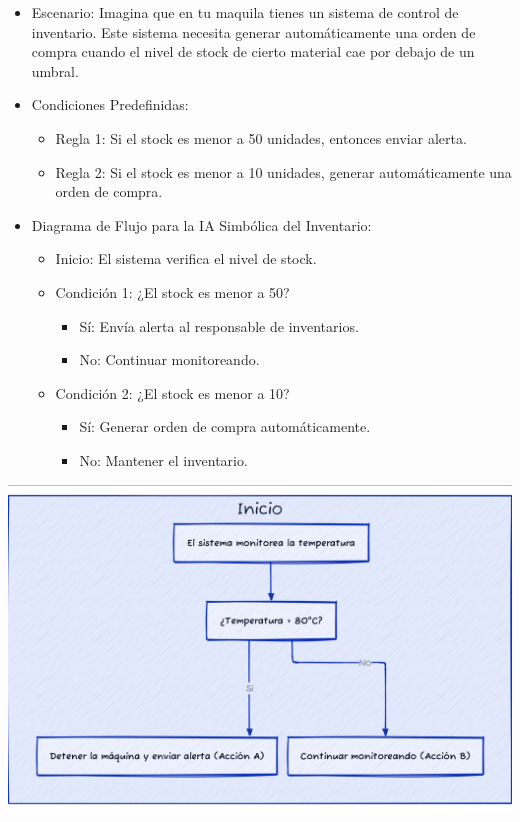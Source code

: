 \documentclass[
  10pt,
  letterpaper,
]{book}
\providecommand{\tightlist}{%
  \setlength{\itemsep}{0pt}\setlength{\parskip}{0pt}}\usepackage{longtable,booktabs,array}
\begin{document}
\begin{itemize}
\item
  Escenario: Imagina que en tu maquila tienes un sistema de control de
  inventario. Este sistema necesita generar automáticamente una orden de
  compra cuando el nivel de stock de cierto material cae por debajo de
  un umbral.
\item
  Condiciones Predefinidas:

  \begin{itemize}
  \tightlist
  \item
    Regla 1: Si el stock es menor a 50 unidades, entonces enviar alerta.
  \item
    Regla 2: Si el stock es menor a 10 unidades, generar automáticamente
    una orden de compra.
  \end{itemize}
\item
  Diagrama de Flujo para la IA Simbólica del Inventario:

  \begin{itemize}
  \tightlist
  \item
    Inicio: El sistema verifica el nivel de stock.
  \item
    Condición 1: ¿El stock es menor a 50?

    \begin{itemize}
    \tightlist
    \item
      Sí: Envía alerta al responsable de inventarios.
    \item
      No: Continuar monitoreando.
    \end{itemize}
  \item
    Condición 2: ¿El stock es menor a 10?

    \begin{itemize}
    \tightlist
    \item
      Sí: Generar orden de compra automáticamente.
    \item
      No: Mantener el inventario.
    \end{itemize}
  \end{itemize}
\end{itemize}

\includegraphics[width=1\textwidth,height=\textheight]{index_files/mediabag/diagram-1.pdf}
\end{document}
